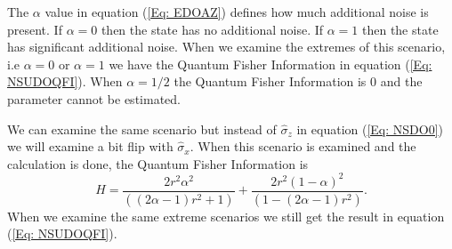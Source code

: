 \documentclass[twocolumn]{article}
\begin{document}
The $\alpha$ value in equation (\ref{Eq: EDOAZ}) defines how much additional noise is present. If $\alpha=0$ then the state has no additional noise. If $\alpha=1$ then the state has significant additional noise. When we examine the extremes of this scenario, i.e $\alpha=0$ or $\alpha=1$ we have the Quantum Fisher Information in equation (\ref{Eq: NSUDOQFI}). When $\alpha=1/2$ the Quantum Fisher Information is 0 and the parameter cannot be estimated.

We can examine the same scenario but instead of $\hat{\sigma}_z$ in equation (\ref{Eq: NSDO0}) we will examine a bit flip with $\hat{\sigma}_x$. When this scenario is examined and the calculation is done, the Quantum Fisher Information is
\begin{equation}\label{Eq: TPOCPFFQFI}
H=\frac{2r^2\alpha^2}{((2\alpha-1)r^2+1)}+\frac{2r^2(1-\alpha)^2}{(1-(2\alpha-1)r^2)}.
\end{equation}
When we examine the same extreme scenarios we still get the result in equation (\ref{Eq: NSUDOQFI}).
\end{document}
